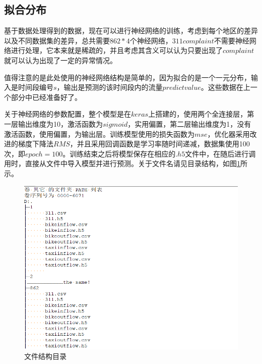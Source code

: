 \documentclass[a4paper, UTF8]{article}
\begin{document}
\begin{CJK}{UTF8}{gbsn}
\subsection{拟合分布}
基于数据处理得到的数据，现在可以进行神经网络的训练，考虑到每个地区的差异以及不同数据集的差异，总共需要$862 * 4$个神经网络，$311 complaint$不需要神经网络进行处理，它本来就是稀疏的，并且考虑其含义可以认为只要出现了$complaint$就可以认为出现了一定的异常情况。
\par 值得注意的是此处使用的神经网络结构是简单的，因为拟合的是一个一元分布，输入是时间段编号$s$，输出是预测的该时间段内的流量$predictvalue$。这些数据在上一个部分中已经准备好了。
\par 关于神经网络的参数配置，整个模型是在$keras$上搭建的，使用两个全连接层，第一层输出维度为10，激活函数为$sigmoid$，实用偏置，第二层输出维度为1，没有激活函数，使用偏置，为输出层。训练模型使用的损失函数为$mse$，优化器采用改进的梯度下降法$RMS$，并且采用回调函数是学习率随时间递减，数据集使用100次，即$epoch = 100$。训练结束之后将模型保存在相应的$.h5$文件中，在随后进行调用时，直接从文件中导入模型并进行预测。关于文件名请见目录结构，如图\ref{file}所示。
\begin{figure}[ht]
\includegraphics[scale = 0.5]{structure.png}
\centering
\caption{文件结构目录}
\label{file}
\end{figure}

\end{CJK}
\end{document}
